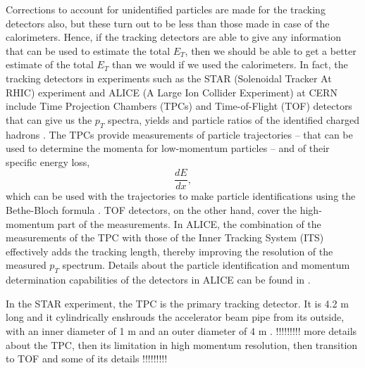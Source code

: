 Corrections to account for unidentified particles are made for the tracking detectors also, but these turn out to be less than those made in case of the calorimeters. Hence, if the tracking detectors are able to give any information that can be used to estimate the total $E_{T}$, then we should be able to get a better estimate of the total $E_{T}$ than we would if we used the calorimeters. In fact, the tracking detectors in experiments such as the STAR (Solenoidal Tracker At RHIC) experiment and ALICE (A Large Ion Collider Experiment) at CERN include Time Projection Chambers (TPCs) and Time-of-Flight (TOF) detectors that can give us the $p_{T}$ spectra, yields and particle ratios of the identified charged hadrons \cite{Preghenella:2011vy, PhysRevC.96.044904}. The TPCs provide measurements of particle trajectories -- that can be used to determine the momenta for low-momentum particles -- and of their specific energy loss, 
\begin{equation}\label{eqn:specificEnLoss}
	\frac{dE}{dx} ,
\end{equation}
which can be used with the trajectories to make particle identifications using the Bethe-Bloch formula \cite{bethe1953passage}. TOF detectors, on the other hand, cover the high-momentum part of the measurements. In ALICE, the combination of the measurements of the TPC with those of the Inner Tracking System (ITS) effectively adds the tracking length, thereby improving the resolution of the measured $p_{T}$ spectrum. Details about the particle identification and momentum determination capabilities of the detectors in ALICE can be found in \cite{1748-0221-3-08-S08002}.

In the STAR experiment, the TPC is the primary tracking detector. It is 4.2 m long and it cylindrically enshrouds the accelerator beam pipe from its outside, with an inner diameter of 1 m and an outer diameter of 4 m \cite{phdthesisnattrass}. !!!!!!!!! more details about the TPC, then its limitation in high momentum resolution, then transition to TOF and some of its details !!!!!!!!!


